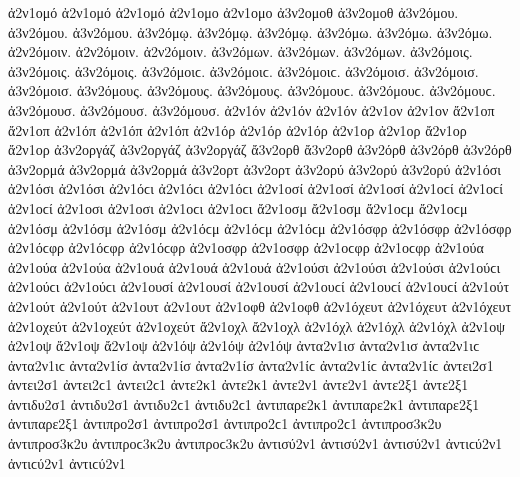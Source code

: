 {ἀ2ν1ομό ἀ2ν1ομό ἀ2ν1ομό 
ἀ2ν1ομο ἀ2ν1ομο   %
ἀ3ν2ομοθ ἀ3ν2ομοθ   %
ἀ3ν2όμου. ἀ3ν2όμου. ἀ3ν2όμου.   %
ἀ3ν2όμῳ. ἀ3ν2όμῳ. ἀ3ν2όμῳ. 
ἀ3ν2όμω. ἀ3ν2όμω. ἀ3ν2όμω. 
ἀ2ν2όμοιν. ἀ2ν2όμοιν. ἀ2ν2όμοιν. 
ἀ3ν2όμων. ἀ3ν2όμων. ἀ3ν2όμων. 
ἀ3ν2όμοις. ἀ3ν2όμοις. ἀ3ν2όμοις. ἀ3ν2όμοιϲ. ἀ3ν2όμοιϲ. ἀ3ν2όμοιϲ. 
ἀ3ν2όμοισ. ἀ3ν2όμοισ. ἀ3ν2όμοισ. 
ἀ3ν2όμους. ἀ3ν2όμους. ἀ3ν2όμους. ἀ3ν2όμουϲ. ἀ3ν2όμουϲ. ἀ3ν2όμουϲ. 
ἀ3ν2όμουσ. ἀ3ν2όμουσ. ἀ3ν2όμουσ. 
ἀ2ν1όν ἀ2ν1όν ἀ2ν1όν   %
ἀ2ν1ον ἀ2ν1ον 
ἄ2ν1οπ ἄ2ν1οπ   %
ἀ2ν1όπ ἀ2ν1όπ ἀ2ν1όπ 
ἀ2ν1όρ ἀ2ν1όρ ἀ2ν1όρ   %
ἀ2ν1ορ ἀ2ν1ορ 
ἄ2ν1ορ ἄ2ν1ορ   %
ἀ3ν2οργάζ ἀ3ν2οργάζ ἀ3ν2οργάζ   %
ἄ3ν2ορθ ἄ3ν2ορθ   %
ἀ3ν2όρθ ἀ3ν2όρθ ἀ3ν2όρθ 
ἀ3ν2ορμά ἀ3ν2ορμά ἀ3ν2ορμά   %
ἀ3ν2ορτ ἀ3ν2ορτ   %
ἀ3ν2ορύ ἀ3ν2ορύ ἀ3ν2ορύ   %
ἀ2ν1όσι ἀ2ν1όσι ἀ2ν1όσι ἀ2ν1όϲι ἀ2ν1όϲι ἀ2ν1όϲι   %
ἀ2ν1οσί ἀ2ν1οσί ἀ2ν1οσί ἀ2ν1οϲί ἀ2ν1οϲί ἀ2ν1οϲί 
ἀ2ν1οσι ἀ2ν1οσι ἀ2ν1οϲι ἀ2ν1οϲι   %
ἄ2ν1οσμ ἄ2ν1οσμ ἄ2ν1οϲμ ἄ2ν1οϲμ   %
ἀ2ν1όσμ ἀ2ν1όσμ ἀ2ν1όσμ ἀ2ν1όϲμ ἀ2ν1όϲμ ἀ2ν1όϲμ 
ἀ2ν1όσφρ ἀ2ν1όσφρ ἀ2ν1όσφρ ἀ2ν1όϲφρ ἀ2ν1όϲφρ ἀ2ν1όϲφρ   %
ἀ2ν1οσφρ ἀ2ν1οσφρ ἀ2ν1οϲφρ ἀ2ν1οϲφρ 
ἀ2ν1ούα ἀ2ν1ούα ἀ2ν1ούα   %
ἀ2ν1ουά ἀ2ν1ουά ἀ2ν1ουά 
ἀ2ν1ούσι ἀ2ν1ούσι ἀ2ν1ούσι ἀ2ν1ούϲι ἀ2ν1ούϲι ἀ2ν1ούϲι   %
ἀ2ν1ουσί ἀ2ν1ουσί ἀ2ν1ουσί ἀ2ν1ουϲί ἀ2ν1ουϲί ἀ2ν1ουϲί 
ἀ2ν1ούτ ἀ2ν1ούτ ἀ2ν1ούτ   %
ἀ2ν1ουτ ἀ2ν1ουτ 
ἀ2ν1οφθ ἀ2ν1οφθ   %
ἀ2ν1όχευτ ἀ2ν1όχευτ ἀ2ν1όχευτ   %
ἀ2ν1οχεύτ ἀ2ν1οχεύτ ἀ2ν1οχεύτ 
ἄ2ν1οχλ ἄ2ν1οχλ   %
ἀ2ν1όχλ ἀ2ν1όχλ ἀ2ν1όχλ 
ἀ2ν1οψ ἀ2ν1οψ   %
ἄ2ν1οψ ἄ2ν1οψ   %
ἀ2ν1όψ ἀ2ν1όψ ἀ2ν1όψ 
ἀντα2ν1ισ ἀντα2ν1ισ ἀντα2ν1ιϲ ἀντα2ν1ιϲ   %
ἀντα2ν1ίσ ἀντα2ν1ίσ ἀντα2ν1ίσ ἀντα2ν1ίϲ ἀντα2ν1ίϲ ἀντα2ν1ίϲ   %
ἀντει2σ1 ἀντει2σ1 ἀντει2ϲ1 ἀντει2ϲ1   %
ἀντε2κ1 ἀντε2κ1   %
ἀντε2ν1 ἀντε2ν1   %
ἀντε2ξ1 ἀντε2ξ1   %
ἀντιδυ2σ1 ἀντιδυ2σ1 ἀντιδυ2ϲ1 ἀντιδυ2ϲ1   %
ἀντιπαρε2κ1 ἀντιπαρε2κ1   %
ἀντιπαρε2ξ1 ἀντιπαρε2ξ1   %
ἀντιπρο2σ1 ἀντιπρο2σ1 ἀντιπρο2ϲ1 ἀντιπρο2ϲ1   %
ἀντιπροσ3κ2υ ἀντιπροσ3κ2υ ἀντιπροϲ3κ2υ ἀντιπροϲ3κ2υ   %
ἀντισύ2ν1 ἀντισύ2ν1 ἀντισύ2ν1 ἀντιϲύ2ν1 ἀντιϲύ2ν1 ἀντιϲύ2ν1   %
}
